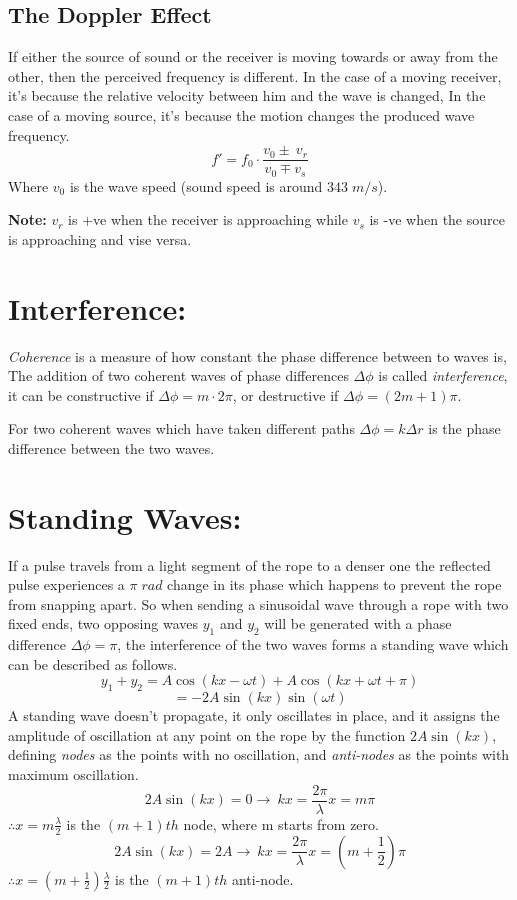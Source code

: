 \documentclass{article}
\begin{document}
\subsection{The Doppler Effect}
If either the source of sound or the receiver is moving towards or away from the other, then the perceived frequency is different. In the case of a moving receiver, it's because the relative velocity between him and the wave is changed, In the case of a moving source, it's because the motion changes the produced wave frequency.
$$f' = f_0 \cdot\frac{v_0 \pm~v_r}{v_0\mp v_s}$$
Where $v_0$ is the wave speed (sound speed is around $343 \; m/s$).

\textbf{Note:} $v_r$ is +ve when the receiver is approaching while $v_s$ is -ve when the source is approaching and vise versa.

\section{Interference:}
\emph{Coherence} is a measure of how constant the phase difference between to waves is, The addition of two coherent waves of phase differences $\Delta \phi$ is called \emph{interference}, it can be constructive if $\Delta \phi = m \cdot 2\pi$, or destructive if $\Delta \phi = (2m + 1)\pi$.

For two coherent waves which have taken different paths $\Delta \phi = k \Delta r$ is the phase difference between the two waves.

\section{Standing Waves:}
If a pulse travels from a light segment of the rope to a denser one the reflected pulse experiences a $\pi \; rad$ change in its phase which happens to prevent the rope from snapping apart. So when sending a sinusoidal wave through a rope with two fixed ends, two opposing waves $y_1$ and $y_2$ will be generated with a phase difference $\Delta \phi = \pi$, the interference of the two waves forms a standing wave which can be described as follows.
$$y_1 + y_2 = A \cos(kx-\omega t) + A \cos(kx + \omega t + \pi)$$
$$= -2A \sin(kx) \sin(\omega t)$$
A standing wave doesn't propagate, it only oscillates in place, and it assigns the amplitude of oscillation at any point on the rope by the function $2A \sin(kx)$, defining \emph{nodes} as the points with no oscillation, and \emph{anti-nodes} as the points with maximum oscillation.
$$2A\sin(kx) = 0 \rightarrow~kx = \frac{2\pi}\lambda x = m\pi$$
$\therefore x = m\frac{\lambda}2$ is the $(m+1)th$ node, where m starts from zero.
$$2A\sin(kx) = 2A \rightarrow~kx = \frac{2\pi}\lambda x = (m + \frac{1}2)\pi$$
$\therefore x = (m + \frac{1}2) \frac{\lambda}2$ is the $(m+1)th$ anti-node.
\end{document}
